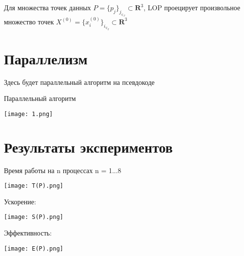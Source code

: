 Для множества точек данных $P = \{p_j\} _j_\in_J \subset \mathbf R^{3}$, LOP проецирует произвольное множество точек $X^{(0)} = \{x_i^{(0)} \} _i_\in_I \subset \mathbf R^{3}$ 


\section{Параллелизм}

Здесь будет параллельный алгоритм на псевдокоде




Параллельный алгоритм

\texttt{[image: 1.png]}

\section{Результаты экспериментов}

Время работы на n процессах n = 1...8


\texttt{[image: T(P).png]}

Ускорение:

\texttt{[image: S(P).png]}

Эффективность:

\texttt{[image: E(P).png]}

